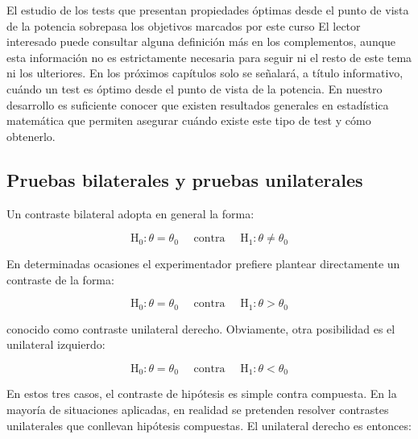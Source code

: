 \documentclass[
]{article}
\begin{document}
El estudio de los tests que presentan propiedades óptimas desde el punto de vista de la potencia sobrepasa los objetivos marcados por este curso El lector interesado puede consultar alguna definición más en los complementos, aunque esta información no es estrictamente necesaria para seguir ni el resto de este tema ni los ulteriores. En los próximos capítulos solo se señalará, a título informativo, cuándo un test es óptimo desde el punto de vista de la potencia. En nuestro desarrollo es suficiente conocer que existen resultados generales en estadística matemática que permiten asegurar cuándo existe este tipo de test y cómo obtenerlo.

\subsection{Pruebas bilaterales y pruebas unilaterales}\label{pruebas-bilaterales-y-pruebas-unilaterales}

Un contraste bilateral adopta en general la forma:

\[
\mathrm{H}_{0}: \theta=\theta_{0} \quad \text { contra } \quad \mathrm{H}_{1}: \theta \neq \theta_{0}
\]

En determinadas ocasiones el experimentador prefiere plantear directamente un contraste de la forma:

\[
\mathrm{H}_{0}: \theta=\theta_{0} \quad \text { contra } \quad \mathrm{H}_{1}: \theta>\theta_{0}
\]

conocido como contraste unilateral derecho. Obviamente, otra posibilidad es el unilateral izquierdo:

\[
\mathrm{H}_{0}: \theta=\theta_{0} \quad \text { contra } \quad \mathrm{H}_{1}: \theta<\theta_{0}
\]

En estos tres casos, el contraste de hipótesis es simple contra compuesta. En la mayoría de situaciones aplicadas, en realidad se pretenden resolver contrastes unilaterales que conllevan hipótesis compuestas. El unilateral derecho es entonces:
\end{document}
